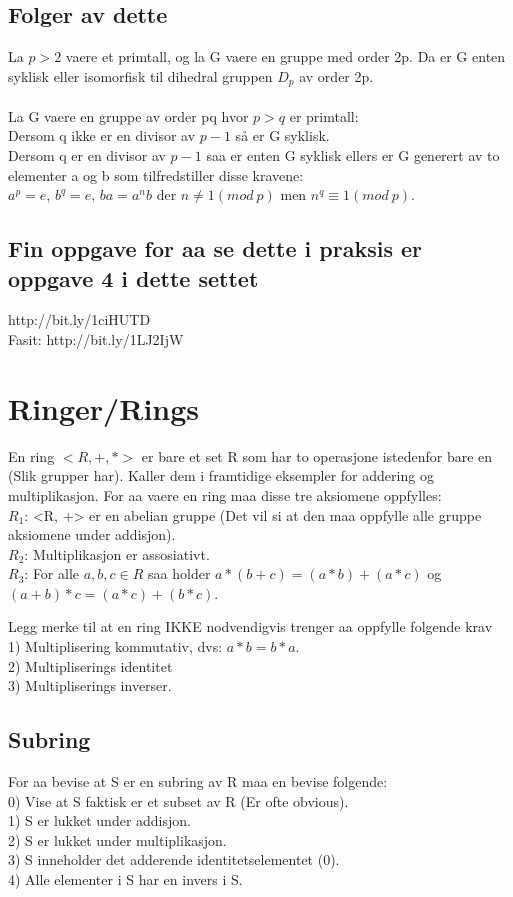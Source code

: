 \documentclass[12pt,a4paper]{article}
\begin{document}
\subsection*{Folger av dette}
La $p>2$ vaere et primtall, og la G vaere en gruppe med order 2p. Da er G enten syklisk eller isomorfisk til dihedral gruppen $D_p$ av order 2p.\\\\

La G vaere en gruppe av order pq hvor $p>q$ er primtall: \\
Dersom q ikke er en divisor av $p-1$ så er G syklisk. \\
Dersom q er en divisor av $p-1$ saa er enten G syklisk ellers er G generert av to elementer a og b som tilfredstiller disse kravene:\\
$a^p = e$, $b^q = e$, $ba = a^n b$ der $n \neq 1(mod\ p)$ men $n^q \equiv 1 (mod\ p)$.

\subsection*{Fin oppgave for aa se dette i praksis er oppgave 4 i dette settet}
http://bit.ly/1ciHUTD\\
Fasit:
http://bit.ly/1LJ2IjW


\section*{Ringer/Rings}
En ring $< R, +, * >$ er bare et set R som har to operasjone istedenfor bare en (Slik grupper har). Kaller dem i framtidige eksempler for addering og multiplikasjon. For aa vaere en ring maa disse tre aksiomene oppfylles:\\
$R_1$: <R, +> er en abelian gruppe (Det vil si at den maa oppfylle alle gruppe aksiomene under addisjon).\\
$R_2$: Multiplikasjon er assosiativt.\\
$R_3$: For alle $a,b,c \in R$ saa holder $a*(b+c) = (a*b) + (a*c)$ og $(a+b) * c = (a*c) + (b*c)$.

Legg merke til at en ring IKKE nodvendigvis trenger aa oppfylle folgende krav\\
1) Multiplisering kommutativ, dvs: $a*b = b*a$.\\
2) Multipliserings identitet\\
3) Multipliserings inverser.\\

\subsection*{Subring}
For aa bevise at S er en subring av R maa en bevise folgende:\\
0) Vise at S faktisk er et subset av R (Er ofte obvious).\\
1) S er lukket under addisjon.\\
2) S er lukket under multiplikasjon.\\
3) S inneholder det adderende identitetselementet (0).\\
4) Alle elementer i S har en invers i S.
\end{document}
